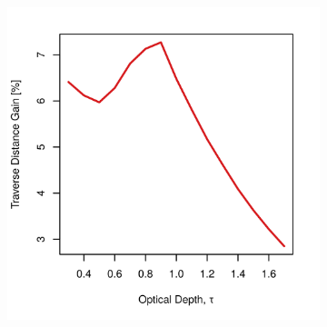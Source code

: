 \begin{figure}[h]
\captionsetup[subfigure]{justification=centering}
\vspace{-2ex}
	\centering
    \setlength{\subfigureWidth}{0.50\textwidth}
    \setlength{\graphicsHeight}{80mm}
    \hypersetup{hidelinks=true}%
    \begin{subfigure}[t]{\subfigureWidth}
        \centering
        \includegraphics[height=\graphicsHeight]{sections/design/solar-array/plots/ianichaos-75w-traverse-gains-for-27m2-sa-area.png}
        \label{fig:plot:sub:iani-chaos-flat-traverse-gains-for-initial-sa-area}
    \end{subfigure}\hfill
    \begin{subfigure}[t]{\subfigureWidth}
        \centering

\end{subfigure}
\end{figure}
